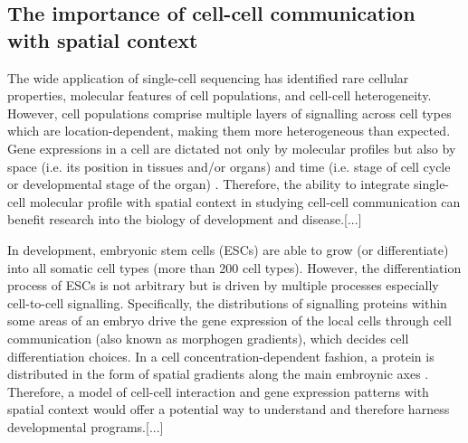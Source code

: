 \subsection{The importance of cell-cell communication with spatial context}
The wide application of single-cell sequencing has identified rare cellular properties, molecular features of cell populations, and cell-cell heterogeneity. However, cell populations comprise multiple layers of signalling across cell types which are location-dependent, making them more heterogeneous than expected. Gene expressions in a cell are dictated not only by molecular profiles but also by space (i.e. its position in tissues and/or organs) and time (i.e. stage of cell cycle or developmental stage of the organ) \cite{salomon2020genomic}. Therefore, the ability to integrate single-cell molecular profile with spatial context in studying cell-cell communication can benefit research into the biology of development and disease.[...] 

In development, embryonic stem cells (ESCs) are able to grow (or differentiate) into all somatic cell types (more than 200 cell types). However, the differentiation process of ESCs is not arbitrary but is driven by multiple processes especially cell-to-cell signalling. Specifically, the distributions of signalling proteins within some areas of an embryo drive the gene expression of the local cells through cell communication (also known as morphogen gradients), which decides cell differentiation choices. In a cell concentration-dependent fashion, a protein is distributed in the form of spatial gradients along the main embroynic axes \cite{trisnadi2013image, ramel2013ventral}. Therefore, a model of cell-cell interaction and gene expression patterns with spatial context would offer a potential way to understand and therefore harness developmental programs.[...]  


